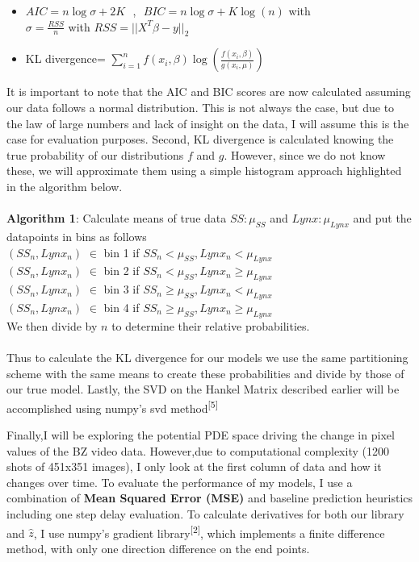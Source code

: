 \documentclass[12pt]{article}
\begin{document}
\begin{itemize}
		\item 
		$AIC = n\log{\sigma} + 2K$ \,\,,\,\,
		$BIC = n\log{\sigma} + K\log(n)$ with \\ $\sigma = \frac{RSS}{n}$ with $RSS=\lvert \lvert X^T\beta - y \rvert \rvert_2$
		\item KL divergence= $\sum_{i=1}^n f(x_i,\beta)\log(\frac{f(x_i,\beta)}{g(x_i,\mu)})$\\

\end{itemize}

It is important to note that the AIC and BIC scores are now calculated assuming our data follows a normal distribution. This is not always the case, but due to the law of large numbers and lack of insight on the data, I will assume this is the case for evaluation purposes. Second, KL divergence is calculated knowing the true probability of our distributions $f$ and $g$. However, since we do not know these, we will approximate them using a simple histogram approach highlighted in the algorithm below.\\\\
\textbf{Algorithm 1}: Calculate means of true data $SS:\mu_{SS}$ and $Lynx:\mu_{Lynx}$  and put the datapoints in bins as follows\\
 $(SS_n,Lynx_n)$ $\in$ bin 1 if $SS_n<\mu_{SS},Lynx_n<\mu_{Lynx}$\\
 $(SS_n,Lynx_n)$ $\in$ bin 2 if $SS_n<\mu_{SS},Lynx_n\ge\mu_{Lynx}$\\
  $(SS_n,Lynx_n)$ $\in$ bin 3 if $SS_n\ge\mu_{SS},Lynx_n<\mu_{Lynx}$\\
    $(SS_n,Lynx_n)$ $\in$ bin 4 if $SS_n\ge\mu_{SS},Lynx_n\ge\mu_{Lynx}$\\
    We then divide by $n$ to determine their relative probabilities. \\\\
    Thus to calculate the KL divergence for our models we use the same partitioning scheme with the same means to create these probabilities and divide by those of our true model. Lastly, the SVD on the Hankel Matrix described earlier will be accomplished using numpy's svd method\textsuperscript{[5]}
\par 
Finally,I will be exploring the potential PDE space driving the change in pixel values of the BZ video data. However,due to computational complexity (1200 shots of 451x351 images), I only look at the first column of data and how it changes over time. To evaluate the performance of my models, I use a combination of \textbf{Mean Squared Error (MSE)} and baseline prediction heuristics including one step delay evaluation. To calculate derivatives for both our library and $\hat{z}$, I use numpy's gradient library\textsuperscript{[2]}, which implements a finite difference method, with only one direction difference on the end points.
\end{document}
